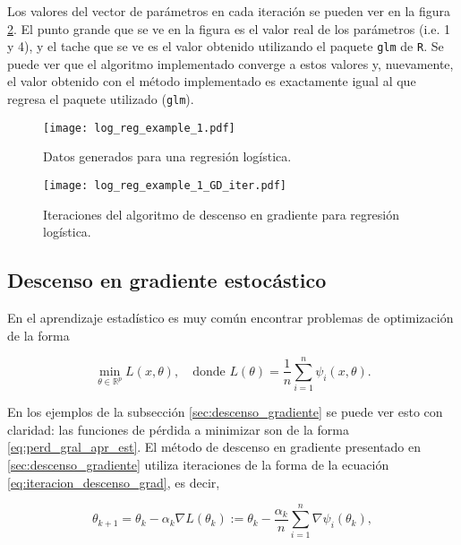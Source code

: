 Los valores del vector de parámetros en cada iteración se pueden ver en la figura \ref{fig:reg_log_ejemplo_GD_iter}. El punto grande que se ve en la figura es el valor real de los parámetros (i.e. 1 y 4), y el tache que se ve es el valor obtenido utilizando el paquete \texttt{glm} de \texttt{R}. Se puede ver que el algoritmo implementado converge a estos valores y, nuevamente, el valor obtenido con el método implementado es exactamente igual al que regresa el paquete utilizado (\texttt{glm}).


\begin{figure}[H]
  \centering
  \texttt{[image: log\_reg\_example\_1.pdf]}
  \caption{Datos generados para una regresión logística.}
  \label{fig:reg_log_ejemplo}
\end{figure}


\begin{figure}[H]
  \centering
  \texttt{[image: log\_reg\_example\_1\_GD\_iter.pdf]}
  \caption{Iteraciones del algoritmo de descenso en gradiente para regresión logística.}
  \label{fig:reg_log_ejemplo_GD_iter}
\end{figure}






\subsection{Descenso en gradiente estocástico}

En el aprendizaje estadístico es muy común encontrar problemas de optimización de la forma

\begin{equation}
  \label{eq:perd_gral_apr_est}
  \min_{\theta \in \mathbb{R}^p} L(x, \theta), \quad \text{donde} \, \, 
    L(\theta) = \frac{1}{n} \sum_{i = 1}^n { \psi_i(x, \theta) }.
\end{equation}

En los ejemplos de la subsección \ref{sec:descenso_gradiente} se puede ver esto con claridad: las funciones de pérdida a minimizar son de la forma \ref{eq:perd_gral_apr_est}. El método de descenso en gradiente presentado en \ref{sec:descenso_gradiente} utiliza iteraciones de la forma de la ecuación \ref{eq:iteracion_descenso_grad}, es decir, 

\[
  \theta_{k+1} = \theta_k - \alpha_k \nabla L(\theta_k) :=\theta_k - \frac{\alpha_k}{n} \sum_{i = 1}^n \nabla \psi_i(\theta_k),
\]

